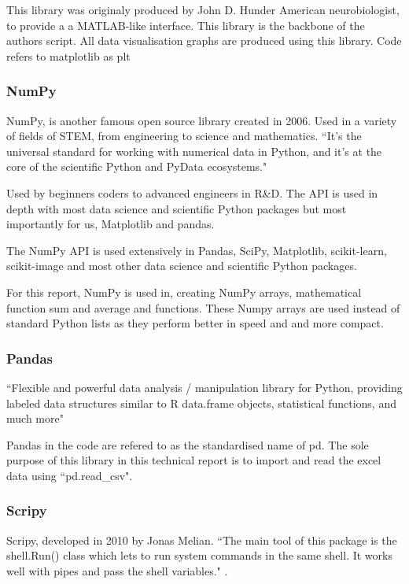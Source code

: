 This library was originaly produced by John D. Hunder American neurobiologist, to provide a a MATLAB-like interface. 
This library is the backbone of the authors script. All data visualisation graphs are produced using this library. Code refers to matplotlib as plt

\subsubsection{NumPy}

NumPy, is another famous open source library created in 2006. Used in a variety of fields of STEM, from engineering to science and mathematics. ``It’s the universal standard for working with numerical data in Python, and it’s at the core of the scientific Python and PyData ecosystems." 

Used by beginners coders to advanced engineers in R\&D. The API is used in depth with most  data science and scientific Python packages but most importantly for us, Matplotlib and pandas. 

The NumPy API is used extensively in Pandas, SciPy, Matplotlib, scikit-learn, scikit-image and most other data science and scientific Python packages.

For this report, NumPy is used in, creating NumPy arrays, mathematical function sum \cite{mhvk} and average and functions. These Numpy arrays are used instead of standard Python lists as they perform better in speed and and more compact. 

\subsubsection{Pandas}

``Flexible and powerful data analysis / manipulation library for Python, providing labeled data structures similar to R data.frame objects, statistical functions, and much more" \cite{pandas}

Pandas in the code are refered to as the standardised name of pd. The sole purpose of this library in this technical report is to import and read the excel data using ``pd.read\_csv".

\subsubsection{Scripy}

Scripy, developed in 2010 by Jonas Melian. ``The main tool of this package is the shell.Run() class which lets to run system commands in the same shell. It works well with pipes and pass the shell variables." \cite{Scripy}.  

